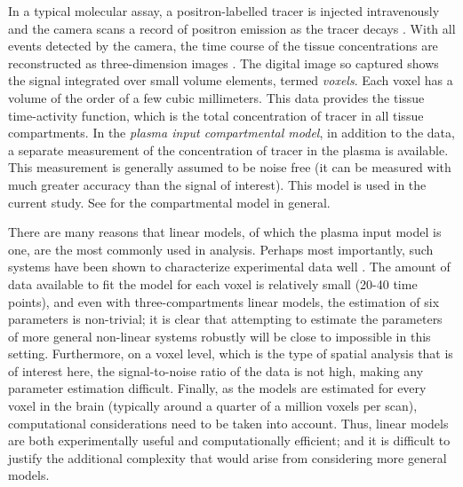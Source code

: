 In a typical molecular assay, a positron-labelled tracer is injected
intravenously and the \pet camera scans a record of positron emission as the
tracer decays \cite{Phelps2000}. With all events detected by the \pet camera,
the time course of the tissue concentrations are reconstructed as
three-dimension images \cite{Kinahan1989}. The digital image so captured
shows the signal integrated over small volume elements, termed \emph{voxels}.
Each voxel has a volume of the order of a few cubic millimeters. This data
provides the tissue time-activity function, which is the total concentration
of tracer in all tissue compartments. In the \emph{plasma input compartmental
model}, in addition to the \pet data, a separate measurement of the
concentration of tracer in the plasma is available. This measurement is
generally assumed to be noise free (it can be measured with much greater
accuracy than the signal of interest). This model is used in the current
study. See \cite{Gunn:2001cx} for the \pet compartmental model in general.

There are many reasons that linear \ode models, of which the plasma input
model is one, are the most commonly used in \pet analysis. Perhaps most
importantly, such systems have been shown to characterize \pet experimental
data well \cite{Lammertsma96}. The amount of data available to fit the model
for each voxel is relatively small (20-40 time points), and even with
three-compartments linear \ode models, the estimation of six parameters is
non-trivial; it is clear that attempting to estimate the parameters of more
general non-linear \ode systems robustly will be close to impossible in this
setting. Furthermore, on a voxel level, which is the type of spatial analysis
that is of interest here, the signal-to-noise ratio of the data is not high,
making any parameter estimation difficult. Finally, as the models are
estimated for every voxel in the brain (typically around a quarter of a
million voxels per scan), computational considerations need to be taken into
account. Thus, linear \ode models are both experimentally useful and
computationally efficient; and it is difficult to justify the additional
complexity that would arise from considering more general models.



